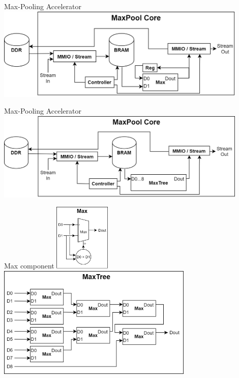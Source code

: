 \begin{frame}{Max-Pooling Accelerator}
	\centering
	\includegraphics[width=0.9\textwidth]{../Images/Platform/MaxPool_core_serial.png}\\
\end{frame}

\begin{frame}{Max-Pooling Accelerator}
	\centering
	\includegraphics[width=0.9\textwidth]{../Images/Platform/MaxPool_core_kernel_parallel.png}\\
\end{frame}

\begin{frame}{Max component}
	\centering
	\includegraphics[width=0.2\textwidth]{../Images/Platform/Max_component.png}
	\hspace{0.5cm}
	\includegraphics[width=0.7\textwidth]{../Images/Platform/MaxTree_component.png}\\
\end{frame}

